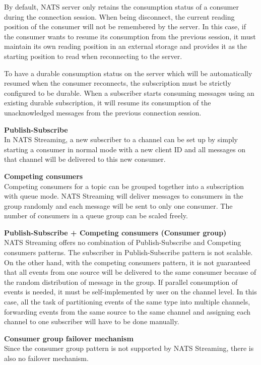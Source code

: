 By default, NATS server only retains the consumption status of a consumer during the connection session. When being disconnect, the current reading position of the consumer will not be remembered by the server. In this case, if the consumer wants to resume its consumption from the previous session, it must maintain its own reading position in an external storage and provides it as the starting position to read when reconnecting to the server. 

To have a durable consumption status on the server which will be automatically resumed when the consumer reconnects, the subscription must be strictly configured to be durable. When a subscriber starts consuming messages using an existing durable subscription, it will resume its consumption of the unacknowledged messages from the previous connection session.

\textbf{Publish-Subscribe}\\
In NATS Streaming, a new subscriber to a channel can be set up by simply starting a consumer in normal mode with a new client ID and all messages on that channel will be delivered to this new consumer. 

\textbf{Competing consumers}\\
Competing consumers for a topic can be grouped together into a subscription with queue mode. NATS Streaming will deliver messages to consumers in the group randomly and each message will be sent to only one consumer. The number of consumers in a queue group can be scaled freely.

\textbf{Publish-Subscribe + Competing consumers (Consumer group)}\\
NATS Streaming offers no combination of Publish-Subscribe and Competing consumers patterns. The subscriber in Publish-Subscribe pattern is not scalable. On the other hand, with the competing consumers pattern, it is not guaranteed that all events from one source will be delivered to the same consumer because of the random distribution of message in the group. If parallel consumption of events is needed, it must be self-implemented by user on the channel level. In this case, all the task of partitioning events of the same type into multiple channels, forwarding events from the same source to the same channel and assigning each channel to one subscriber will have to be done manually.

\textbf{Consumer group failover mechanism}\\
Since the consumer group pattern is not supported by NATS Streaming, there is also no failover mechanism.

